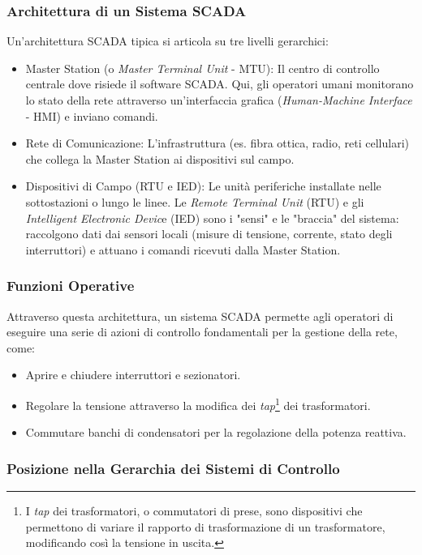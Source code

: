 \subsubsection{Architettura di un Sistema SCADA}

Un'architettura SCADA tipica si articola su tre livelli gerarchici:

\begin{itemize}
    \item Master Station (o\textit{ Master Terminal Unit} - MTU): Il centro di controllo centrale dove risiede il software SCADA. Qui, gli operatori umani monitorano lo stato della rete attraverso un'interfaccia grafica (\textit{Human-Machine Interface} - HMI) e inviano comandi.
    \item Rete di Comunicazione: L'infrastruttura (es. fibra ottica, radio, reti cellulari) che collega la Master Station ai dispositivi sul campo.
    \item Dispositivi di Campo (RTU e IED): Le unità periferiche installate nelle sottostazioni o lungo le linee. Le \textit{Remote Terminal Unit} (RTU) e gli \textit{Intelligent Electronic Devic}e (IED) sono i "sensi" e le "braccia" del sistema: raccolgono dati dai sensori locali (misure di tensione, corrente, stato degli interruttori) e attuano i comandi ricevuti dalla Master Station.
\end{itemize}

\subsubsection{Funzioni Operative}

Attraverso questa architettura, un sistema SCADA permette agli operatori di eseguire una serie di azioni di controllo fondamentali per la gestione della rete, come:

\begin{itemize}
    \item Aprire e chiudere interruttori e sezionatori.
    \item Regolare la tensione attraverso la modifica dei \textit{tap}\footnote{I \textit{tap} dei trasformatori, o commutatori di prese, sono dispositivi che permettono di variare il rapporto di trasformazione di un trasformatore, modificando così la tensione in uscita.} dei trasformatori.
    \item Commutare banchi di condensatori per la regolazione della potenza reattiva.
\end{itemize}

\subsubsection{Posizione nella Gerarchia dei Sistemi di Controllo}

